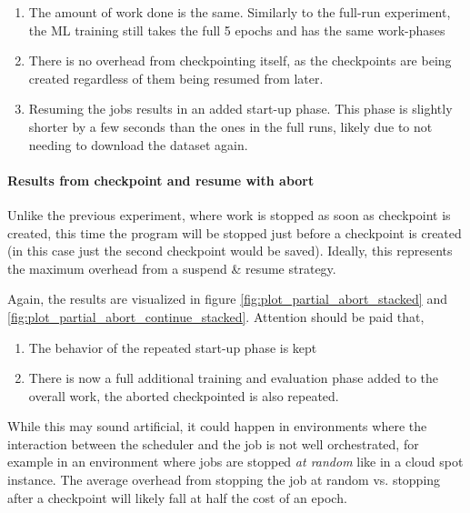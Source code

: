 \begin{enumerate}
    \item The amount of work done is the same. 
    Similarly to the full-run experiment, the ML training still takes the full 5 epochs and has the same work-phases
    \item There is no overhead from checkpointing itself, as the checkpoints are being created regardless of them being resumed from later.
    \item Resuming the jobs results in an added start-up phase. This phase is slightly shorter by a few seconds than the ones in the full runs, likely due to not needing to download the dataset again.
\end{enumerate}

\paragraph{Results from checkpoint and resume with abort}

Unlike the previous experiment, where work is stopped as soon as checkpoint is created, this time the program will be stopped just before a checkpoint is created (in this case just the second checkpoint would be saved). 
Ideally, this represents the maximum overhead from a suspend \& resume strategy. 

Again, the results are visualized in figure \ref{fig:plot_partial_abort_stacked} and \ref{fig:plot_partial_abort_continue_stacked}. 
Attention should be paid that,

\begin{enumerate}
    \item The behavior of the repeated start-up phase is kept
    \item There is now a full additional training and evaluation phase added to the overall work, the aborted checkpointed is also repeated.
\end{enumerate}

While this may sound artificial, it could happen in environments where the interaction between the scheduler and the job is not well orchestrated, for example in an environment where jobs are stopped \emph{at random} like in a cloud spot instance. 
The average overhead from stopping the job at random vs. stopping after a checkpoint will likely fall at half the cost of an epoch.

